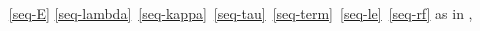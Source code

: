   \begin{multicols}{2}
    \begin{enumerate}[topsep=0pt,label=(\textsc{s}\arabic*),ref=\textsc{s}\arabic*]
    \item[\eqref{seq-E}]
      \eqref{seq-lambda}\,
      \eqref{seq-kappa}\,
      \eqref{seq-tau}\,
      \eqref{seq-term}\,
      \eqref{seq-le}\, 
      \eqref{seq-rf}
      as in
      ,
      \setcounter{enumi}{\value{le}}
    \item[]
      \begin{enumerate}[leftmargin=0pt]

\end{enumerate}
\end{enumerate}
\end{multicols}
